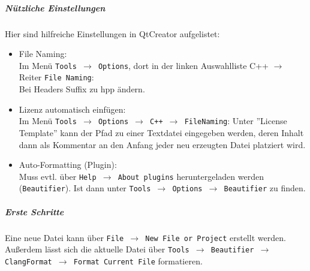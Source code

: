 \subparagraph{Nützliche Einstellungen}
Hier sind hilfreiche Einstellungen in QtCreator aufgelistet:
\begin{itemize}
	\item File Naming:\\
  Im Menü \texttt{Tools $\rightarrow$ Options}, dort in der linken Auswahlliste C++ $\rightarrow$
  Reiter \texttt{File Naming}:\\ Bei Headers Suffix zu hpp ändern.

	\item Lizenz automatisch einfügen:\\
  Im Menü \texttt{Tools $\rightarrow$ Options $\rightarrow$ C++ $\rightarrow$ FileNaming}: Unter ''License
  Template'' kann der Pfad zu einer Textdatei eingegeben werden, deren Inhalt
  dann als Kommentar an den Anfang jeder neu erzeugten Datei platziert wird.

	\item Auto-Formatting (Plugin):\\
  Muss evtl. über \texttt{Help $\rightarrow$ About plugins} heruntergeladen werden (\texttt{Beautifier}).
  Ist dann unter \texttt{Tools $\rightarrow$ Options $\rightarrow$ Beautifier} zu finden.
  \end{itemize}

\subparagraph{Erste Schritte}

Eine neue Datei kann über \texttt{File $\rightarrow$ New File or Project} erstellt werden.\\
Außerdem lässt sich die aktuelle Datei über \texttt{Tools $\rightarrow$ Beautifier $\rightarrow$ ClangFormat $\rightarrow$ Format Current File} formatieren.

